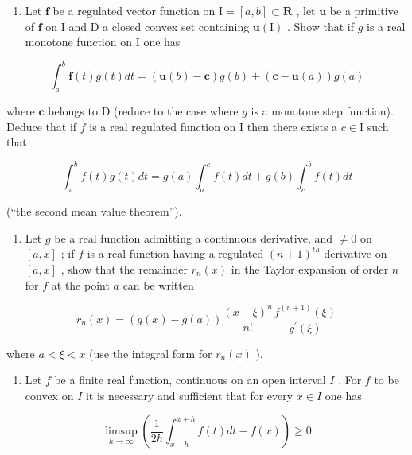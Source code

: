 \begin{enumerate}
\def\labelenumi{\arabic{enumi})}
\setcounter{enumi}{15}
\tightlist
\item
  Let \(\mathbf{f}\) be a regulated vector function on \(\mathrm{I} = [a, b] \subset \mathbf{R}\) , let \(\mathbf{u}\) be a primitive of \(\mathbf{f}\) on \(\mathrm{I}\) and \(\mathrm{D}\) a closed convex set containing \(\mathbf{u}(\mathrm{I})\) . Show that if \(g\) is a real monotone function on \(\mathrm{I}\) one has
\end{enumerate}

\[
\int_ {a} ^ {b} \mathbf {f} (t) g (t) d t = (\mathbf {u} (b) - \mathbf {c}) g (b) + (\mathbf {c} - \mathbf {u} (a)) g (a)
\]

where \(\mathbf{c}\) belongs to D (reduce to the case where \(g\) is a monotone step function). Deduce that if \(f\) is a real regulated function on I then there exists a \(c \in \mathrm{I}\) such that

\[
\int_ {a} ^ {b} f (t) g (t) d t = g (a) \int_ {a} ^ {c} f (t) d t + g (b) \int_ {c} ^ {b} f (t) d t
\]

(``the second mean value theorem'').

\begin{enumerate}
\def\labelenumi{\arabic{enumi})}
\setcounter{enumi}{16}
\tightlist
\item
  Let \(g\) be a real function admitting a continuous derivative, and \(\neq 0\) on \([a, x]\) ; if \(f\) is a real function having a regulated \((n + 1)^{th}\) derivative on \([a, x]\) , show that the remainder \(r_n(x)\) in the Taylor expansion of order \(n\) for \(f\) at the point \(a\) can be written
\end{enumerate}

\[
r _ {n} (x) = (g (x) - g (a)) \frac {(x - \xi) ^ {n}}{n !} \frac {f ^ {(n + 1)} (\xi)}{g ^ {\prime} (\xi)}
\]

where \(a < \xi < x\) (use the integral form for \(r_{n}(x)\) ).

\begin{enumerate}
\def\labelenumi{\arabic{enumi})}
\setcounter{enumi}{17}
\tightlist
\item
  Let \(f\) be a finite real function, continuous on an open interval \(I\) . For \(f\) to be convex on \(I\) it is necessary and sufficient that for every \(x \in I\) one has
\end{enumerate}

\[
\operatorname * {l i m s u p} _ {h \to \infty} \left(\frac {1}{2 h} \int_ {x - h} ^ {x + h} f (t) d t - f (x)\right) \geqslant 0
\]

